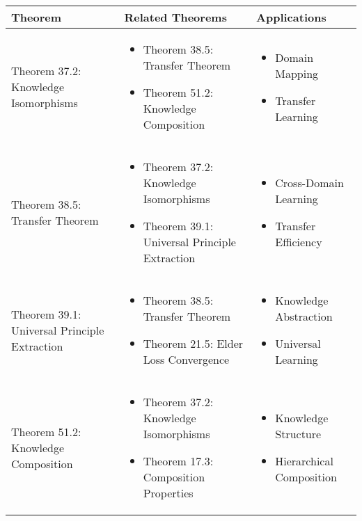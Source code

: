 \begin{table}[h]
\centering
\begin{tabular}{|l|p{7cm}|p{4cm}|}
\hline
\textbf{Theorem} & \textbf{Related Theorems} & \textbf{Applications} \\
\hline
Theorem 37.2: Knowledge Isomorphisms &
\begin{itemize}
    \item Theorem 38.5: Transfer Theorem
    \item Theorem 51.2: Knowledge Composition
\end{itemize} &
\begin{itemize}
    \item Domain Mapping
    \item Transfer Learning
\end{itemize} \\
\hline
Theorem 38.5: Transfer Theorem &
\begin{itemize}
    \item Theorem 37.2: Knowledge Isomorphisms
    \item Theorem 39.1: Universal Principle Extraction
\end{itemize} &
\begin{itemize}
    \item Cross-Domain Learning
    \item Transfer Efficiency
\end{itemize} \\
\hline
Theorem 39.1: Universal Principle Extraction &
\begin{itemize}
    \item Theorem 38.5: Transfer Theorem
    \item Theorem 21.5: Elder Loss Convergence
\end{itemize} &
\begin{itemize}
    \item Knowledge Abstraction
    \item Universal Learning
\end{itemize} \\
\hline
Theorem 51.2: Knowledge Composition &
\begin{itemize}
    \item Theorem 37.2: Knowledge Isomorphisms
    \item Theorem 17.3: Composition Properties
\end{itemize} &
\begin{itemize}
    \item Knowledge Structure
    \item Hierarchical Composition

\end{itemize}
\end{tabular}
\end{table}
